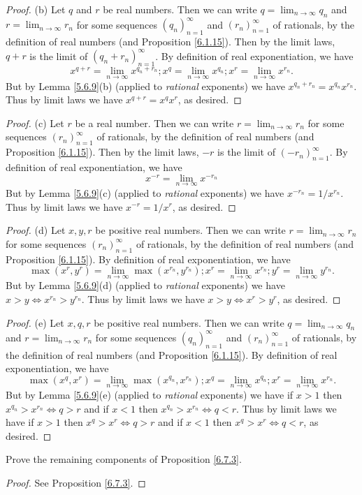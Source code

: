 \begin{proof}{(b)}
Let \(q\) and \(r\) be real numbers.
Then we can write \(q = \lim_{n \to \infty} q_n\) and \(r = \lim_{n \to \infty} r_n\) for some sequences \((q_n)_{n = 1}^\infty\) and \((r_n)_{n = 1}^\infty\) of rationals, by the definition of real numbers (and Proposition \ref{6.1.15}).
Then by the limit laws, \(q + r\) is the limit of \((q_n + r_n)_{n = 1}^\infty\).
By definition of real exponentiation, we have
\[
    x^{q + r} = \lim_{n \to \infty} x^{q_n + r_n} ; x^q = \lim_{n \to \infty} x^{q_n} ;  x^r = \lim_{n \to \infty} x^{r_n}.
\]
But by Lemma \ref{5.6.9}(b) (applied to \emph{rational} exponents) we have \(x^{q_n + r_n} = x^{q_n} x^{r_n}\).
Thus by limit laws we have \(x^{q + r} = x^q x^r\), as desired.
\end{proof}

\begin{proof}{(c)}
Let \(r\) be a real number.
Then we can write \(r = \lim_{n \to \infty} r_n\) for some sequences \((r_n)_{n = 1}^\infty\) of rationals, by the definition of real numbers (and Proposition \ref{6.1.15}).
Then by the limit laws, \(-r\) is the limit of \((-r_n)_{n = 1}^\infty\).
By definition of real exponentiation, we have
\[
    x^{-r} = \lim_{n \to \infty} x^{-r_n}
\]
But by Lemma \ref{5.6.9}(c) (applied to \emph{rational} exponents) we have \(x^{-r_n} = 1 / x^{r_n}\).
Thus by limit laws we have \(x^{-r} = 1 / x^r\), as desired.
\end{proof}

\begin{proof}{(d)}
Let \(x, y, r\) be positive real numbers.
Then we can write \(r = \lim_{n \to \infty} r_n\) for some sequences \((r_n)_{n = 1}^\infty\) of rationals, by the definition of real numbers (and Proposition \ref{6.1.15}).
By definition of real exponentiation, we have
\[
    \max(x^r, y^r) = \lim_{n \to \infty} \max(x^{r_n}, y^{r_n}) ; x^r = \lim_{n \to \infty} x^{r_n} ; y^r = \lim_{n \to \infty} y^{r_n}.
\]
But by Lemma \ref{5.6.9}(d) (applied to \emph{rational} exponents) we have \(x > y \iff x^{r_n} > y^{r_n}\).
Thus by limit laws we have \(x > y \iff x^r > y^r\), as desired.
\end{proof}

\begin{proof}{(e)}
Let \(x, q, r\) be positive real numbers.
Then we can write \(q = \lim_{n \to \infty} q_n\) and \(r = \lim_{n \to \infty} r_n\) for some sequences \((q_n)_{n = 1}^\infty\) and \((r_n)_{n = 1}^\infty\) of rationals, by the definition of real numbers (and Proposition \ref{6.1.15}).
By definition of real exponentiation, we have
\[
    \max(x^q, x^r) = \lim_{n \to \infty} \max(x^{q_n}, x^{r_n}); x^q = \lim_{n \to \infty} x^{q_n} ; x^r = \lim_{n \to \infty} x^{r_n}.
\]
But by Lemma \ref{5.6.9}(e) (applied to \emph{rational} exponents) we have if \(x > 1\) then \(x^{q_n} > x^{r_n} \iff q > r\) and if \(x < 1\) then \(x^{q_n} > x^{r_n} \iff q < r\).
Thus by limit laws we have if \(x > 1\) then \(x^q > x^r \iff q > r\) and if \(x < 1\) then \(x^q > x^r \iff q < r\), as desired.
\end{proof}

\exercisesection

\begin{exercise}\label{ex 6.7.1}
Prove the remaining components of Proposition \ref{6.7.3}.
\end{exercise}

\begin{proof}
See Proposition \ref{6.7.3}.
\end{proof}